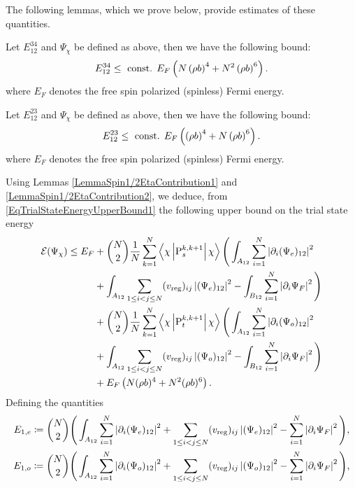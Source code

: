 The following lemmas, which we prove below, provide estimates of these quantities.
\begin{lemma}\label{LemmaSpin1/2EtaContribution1}
	Let $ E_{12}^{34} $ and $ \Psi_{\chi} $ be defined as above, then we have the following bound:\begin{equation}
	E_{12}^{34}\leq \textnormal{ const. } E_F\left(N\left(\rho b\right)^4+N^2\left(\rho b\right)^6 \right).
	\end{equation}
	where $ E_F $ denotes the free spin polarized (spinless) Fermi energy.
\end{lemma}

\begin{lemma}\label{LemmaSpin1/2EtaContribution2}
	Let $ E_{12}^{23} $ and $ \Psi_{\chi} $ be defined as above, then we have the following bound:\begin{equation}
	E_{12}^{23}\leq \textnormal{ const. } E_F\left(\left(\rho b\right)^4+N\left(\rho b\right)^6 \right).
	\end{equation}
	where $ E_F $ denotes the free spin polarized (spinless) Fermi energy.
\end{lemma}
Using Lemmas \ref{LemmaSpin1/2EtaContribution1} and \ref{LemmaSpin1/2EtaContribution2}, we deduce, from \eqref{EqTrialStateEnergyUpperBound1} the following upper bound on the trial state energy
\begin{equation}\label{EqSpin1/2EnergyUpperBound}
\begin{aligned}
\mathcal{E}(\Psi_{\chi})\leq E_F&+\binom{N}{2}\frac{1}{N}\sum_{k=1}^{N}\left\langle\chi \left\lvert \operatorname{P}^{k,k+1}_s  \right\rvert \chi\right\rangle\Bigg(\int_{A_{12}}\sum_{i=1}^{N}\left\lvert \partial_i(\Psi_e)_{12} \right\rvert^2\\
&+\int_{A_{12}}\sum_{1\leq i<j\leq N}(v_{\text{reg}})_{ij}\left\lvert (\Psi_e)_{12} \right\rvert^2-\int_{B_{12}}\sum_{i=1}^{N}\left\lvert \partial_i \Psi_F \right\rvert^2\Bigg)\\
&+\binom{N}{2}\frac{1}{N}\sum_{k=1}^{N}\left\langle\chi \left\lvert \operatorname{P}^{k,k+1}_t  \right\rvert \chi\right\rangle\Bigg(\int_{A_{12}}\sum_{i=1}^{N}\left\lvert \partial_i(\Psi_o)_{12} \right\rvert^2\\
&+\int_{A_{12}}\sum_{1\leq i<j\leq N}(v_{\text{reg}})_{ij}\left\lvert (\Psi_o)_{12} \right\rvert^2-\int_{B_{12}}\sum_{i=1}^{N}\left\lvert \partial_i \Psi_F \right\rvert^2\Bigg)\\
&+E_F\left(N(\rho b)^4+ N^2 (\rho b)^6\right).
\end{aligned}
\end{equation}
Defining the quantities \begin{equation}
\begin{aligned}
E_{1,e}\coloneqq\binom{N}{2}\Bigg(\int_{A_{12}}\sum_{i=1}^{N}\left\lvert \partial_i(\Psi_e)_{12} \right\rvert^2
&+\sum_{1\leq i<j\leq N}(v_{\text{reg}})_{ij}\left\lvert (\Psi_e)_{12} \right\rvert^2-\sum_{i=1}^{N}\left\lvert \partial_i \Psi_F \right\rvert^2\Bigg),\\
E_{1,o}\coloneqq\binom{N}{2}\Bigg(\int_{A_{12}}\sum_{i=1}^{N}\left\lvert \partial_i(\Psi_o)_{12} \right\rvert^2
&+\sum_{1\leq i<j\leq N}(v_{\text{reg}})_{ij}\left\lvert (\Psi_o)_{12} \right\rvert^2-\sum_{i=1}^{N}\left\lvert \partial_i \Psi_F \right\rvert^2\Bigg),
\end{aligned}
\end{equation}
